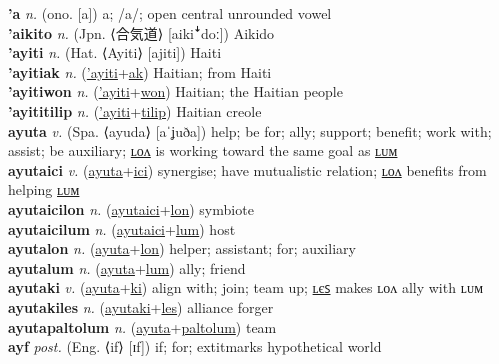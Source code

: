 \textbf{'a} \textit{n.} (ono. [a])
a; /a/; open central unrounded vowel \label{'a} \\
\textbf{'aikito} \textit{n.} (Jpn. ⟨合気道⟩ [aikiꜜdoː])
Aikido \label{'aikito} \\
\textbf{'ayiti} \textit{n.} (Hat. ⟨Ayiti⟩ [ajiti])
Haiti \label{'ayiti} \\
\textbf{'ayitiak} \textit{n.} (\hyperref['ayiti]{'ayiti}+\hyperref[ak]{ak})
Haitian; from Haiti \label{'ayitiak} \\
\textbf{'ayitiwon} \textit{n.} (\hyperref['ayiti]{'ayiti}+\hyperref[won]{won})
Haitian; the Haitian people \label{'ayitiwon} \\
\textbf{'ayititilip} \textit{n.} (\hyperref['ayiti]{'ayiti}+\hyperref[tilip]{tilip})
Haitian creole \label{'ayititilip} \\
\textbf{ayuta} \textit{v.} (Spa. ⟨ayuda⟩ [aˈʝuða])
help; be for; ally; support; benefit; work with; assist; be auxiliary; \hyperref[ayutalon]{ʟᴏᴧ} is working toward the same goal as \hyperref[ayutalum]{ʟᴜᴍ} \label{ayuta} \\
\textbf{ayutaici} \textit{v.} (\hyperref[ayuta]{ayuta}+\hyperref[ici]{ici})
synergise; have mutualistic relation; \hyperref[ayutaicilon]{ʟᴏᴧ} benefits from helping \hyperref[ayutaicilum]{ʟᴜᴍ} \label{ayutaici} \\
\textbf{ayutaicilon} \textit{n.} (\hyperref[ayutaici]{ayutaici}+\hyperref[lon]{lon})
symbiote \label{ayutaicilon} \\
\textbf{ayutaicilum} \textit{n.} (\hyperref[ayutaici]{ayutaici}+\hyperref[lum]{lum})
host \label{ayutaicilum} \\
\textbf{ayutalon} \textit{n.} (\hyperref[ayuta]{ayuta}+\hyperref[lon]{lon})
helper; assistant; for; auxiliary \label{ayutalon} \\
\textbf{ayutalum} \textit{n.} (\hyperref[ayuta]{ayuta}+\hyperref[lum]{lum})
ally; friend \label{ayutalum} \\
\textbf{ayutaki} \textit{v.} (\hyperref[ayuta]{ayuta}+\hyperref[ki]{ki})
align with; join; team up; \hyperref[ayutakiles]{ʟєꜱ} makes ʟᴏᴧ ally with ʟᴜᴍ \label{ayutaki} \\
\textbf{ayutakiles} \textit{n.} (\hyperref[ayutaki]{ayutaki}+\hyperref[les]{les})
alliance forger \label{ayutakiles} \\
\textbf{ayutapaltolum} \textit{n.} (\hyperref[ayuta]{ayuta}+\hyperref[paltolum]{paltolum})
team \label{ayutapaltolum} \\
\textbf{ayf} \textit{post.} (Eng. ⟨if⟩ [ɪf])
if; for; 	extit{marks hypothetical world} \label{ayf} \\
